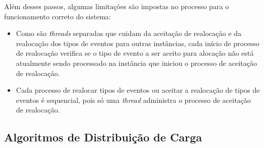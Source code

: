 Além desses passos, algumas limitações são impostas no processo para o funcionamento correto do sistema:
\begin{itemize}

\item Como são \textit{threads} separadas que cuidam da aceitação de realocação e da realocação dos tipos de eventos para outras instâncias,  cada início de processo de realocação verifica se o tipo de evento a ser aceito para alocação não está atualmente sendo processado na instância que iniciou o processo de aceitação de realocação.

\item Cada processo de realocar tipos de eventos ou aceitar a realocação de tipos de eventos é sequencial, pois só uma \textit{thread} administra o processo de aceitação de realocação.

\end{itemize}


\subsection{Algoritmos de Distribuição de Carga}
\label{sec:loadDistribution}

